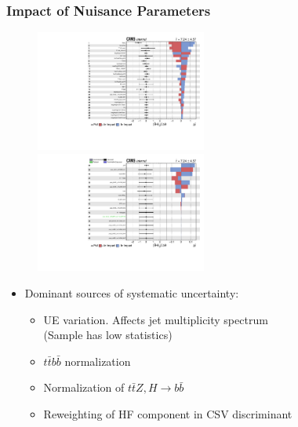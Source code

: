 \documentclass{beamer}
\begin{document}

\begin{frame}
\frametitle{Impact of Nuisance Parameters}
\begin{figure}
\includegraphics[width=0.5\textwidth]{large_stat/combo/pg_0001}
\includegraphics[width=0.5\textwidth]{large_stat/combo/pg_0002}
\end{figure}
\begin{itemize}
	\item Dominant sources of systematic uncertainty:
	\begin{itemize}
	\item UE variation. Affects jet multiplicity spectrum\\(Sample has low statistics)
	\item $t\bar{t}b\bar{b}$ normalization
	\item Normalization of $t\bar{t}Z,H \rightarrow b\bar{b}$
	\item Reweighting of HF component in CSV discriminant 
	\end{itemize}
\end{itemize}
\end{frame}

\end{document}

